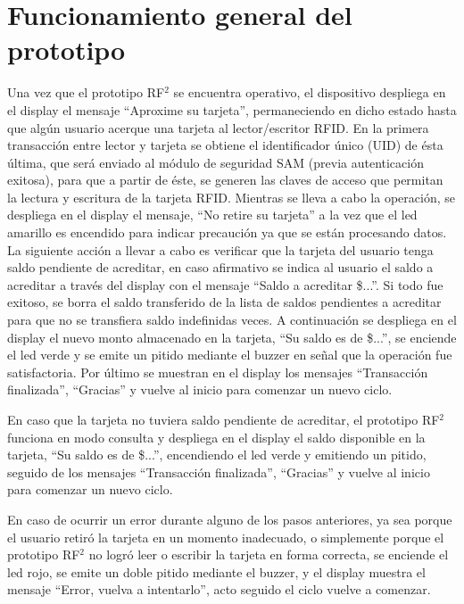 \section{Funcionamiento general del prototipo}
Una vez que el prototipo RF$^{2}$ se encuentra operativo, el dispositivo despliega en el display el mensaje “Aproxime su tarjeta”, permaneciendo en dicho estado hasta que algún usuario acerque una tarjeta al lector/escritor RFID. 
En la primera transacción entre lector y tarjeta se obtiene el identificador único (UID) de ésta última, que será enviado al módulo de seguridad SAM (previa autenticación exitosa), para que a partir de éste, se generen las claves de acceso que permitan la lectura y escritura de la tarjeta RFID.
Mientras se lleva a cabo la operación, se despliega en el display el mensaje, “No retire su tarjeta” a la vez que el led amarillo es encendido para indicar precaución ya que se están procesando datos.
La siguiente acción a llevar a cabo es verificar que la tarjeta del usuario tenga saldo pendiente de acreditar, en caso afirmativo se indica al usuario el saldo a acreditar a través del display con el mensaje “Saldo a acreditar \$...”. Si todo fue exitoso, se borra el saldo transferido de la lista de saldos pendientes a acreditar para que no se transfiera saldo indefinidas veces.
A continuación se despliega en el display el nuevo monto almacenado en la tarjeta, “Su saldo es de \$...”, se enciende el led verde y se emite un pitido mediante el buzzer en señal que la operación fue satisfactoria.
Por último se muestran en el display los mensajes “Transacción finalizada”, “Gracias” y vuelve al inicio para comenzar un nuevo ciclo.

En caso que la tarjeta no tuviera saldo pendiente de acreditar, el prototipo RF$^{2}$ funciona en modo consulta y despliega en el display el saldo disponible en la tarjeta, “Su saldo es de \$...”, encendiendo el led verde y emitiendo un pitido, seguido de los mensajes “Transacción finalizada”, “Gracias” y vuelve al inicio para comenzar un nuevo ciclo.

\newpage
En caso de ocurrir un error durante alguno de los pasos anteriores, ya sea porque
el usuario retiró la tarjeta en un momento inadecuado, o simplemente porque el prototipo RF$^{2}$
no logró leer o escribir la tarjeta en forma correcta, se enciende el led rojo, se emite un
doble pitido mediante el buzzer, y el display muestra el mensaje “Error, vuelva a intentarlo”,
acto seguido el ciclo vuelve a comenzar. 


